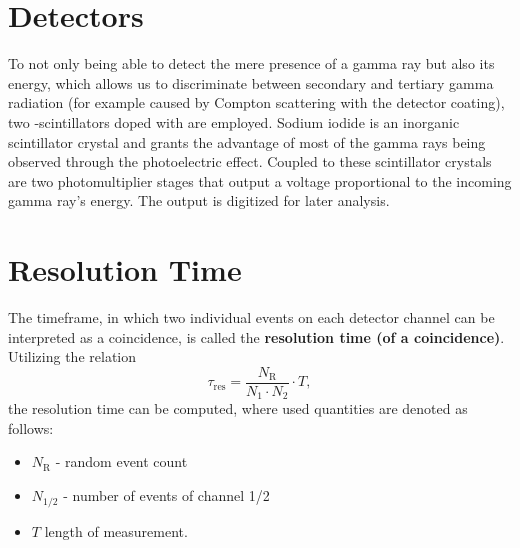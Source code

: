 \section{Detectors}\label{sec:detectors}
To not only being able to detect the mere presence of a gamma ray but also its energy, which allows us to discriminate between secondary and tertiary gamma radiation (for example caused by Compton scattering with the detector coating), two -scintillators doped with  are employed.
Sodium iodide is an inorganic scintillator crystal and grants the advantage of most of the gamma rays being observed through the photoelectric effect.
Coupled to these scintillator crystals are two photomultiplier stages that output a voltage proportional to the incoming gamma ray's energy. 
The output is digitized for later analysis.

\section{Resolution Time}
The timeframe, in which two individual events on each detector channel can be interpreted as a coincidence, is called the \textbf{resolution time (of a coincidence)}.
Utilizing the relation
\begin{equation}\label{eq:res_time}
	\tau_\text{res}=\frac{N_\text{R}}{N_1\cdot N_2}\cdot T,
\end{equation}
the resolution time can be computed, where used quantities are denoted as follows:
\begin{itemize}
	\item $N_\text{R}$ - random event count
	\item $N_{1/2}$ - number of events of channel 1/2
	\item $T$ length of measurement.
\end{itemize}
